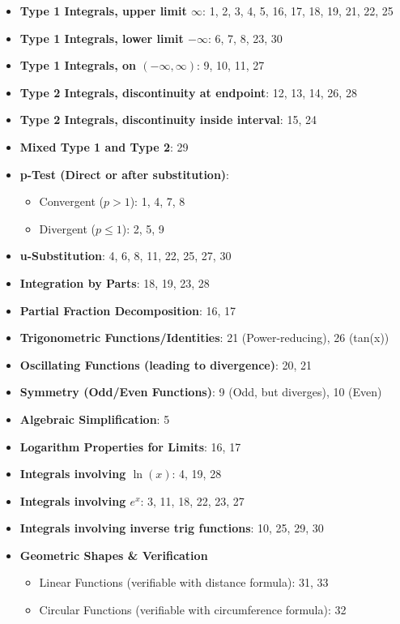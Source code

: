 \documentclass{article}
\begin{document}
\begin{itemize}
    \item \textbf{Type 1 Integrals, upper limit $\infty$}: 1, 2, 3, 4, 5, 16, 17, 18, 19, 21, 22, 25
    \item \textbf{Type 1 Integrals, lower limit $-\infty$}: 6, 7, 8, 23, 30
    \item \textbf{Type 1 Integrals, on $(-\infty, \infty)$}: 9, 10, 11, 27
    \item \textbf{Type 2 Integrals, discontinuity at endpoint}: 12, 13, 14, 26, 28
    \item \textbf{Type 2 Integrals, discontinuity inside interval}: 15, 24
    \item \textbf{Mixed Type 1 and Type 2}: 29
    \item \textbf{p-Test (Direct or after substitution)}:
    	\begin{itemize}
    		\item Convergent ($p > 1$): 1, 4, 7, 8
    		\item Divergent ($p \le 1$): 2, 5, 9
    	\end{itemize}
    \item \textbf{u-Substitution}: 4, 6, 8, 11, 22, 25, 27, 30
    \item \textbf{Integration by Parts}: 18, 19, 23, 28
    \item \textbf{Partial Fraction Decomposition}: 16, 17
    \item \textbf{Trigonometric Functions/Identities}: 21 (Power-reducing), 26 (tan(x))
    \item \textbf{Oscillating Functions (leading to divergence)}: 20, 21
    \item \textbf{Symmetry (Odd/Even Functions)}: 9 (Odd, but diverges), 10 (Even)
    \item \textbf{Algebraic Simplification}: 5
    \item \textbf{Logarithm Properties for Limits}: 16, 17
    \item \textbf{Integrals involving $\ln(x)$}: 4, 19, 28
    \item \textbf{Integrals involving $e^x$}: 3, 11, 18, 22, 23, 27
    \item \textbf{Integrals involving inverse trig functions}: 10, 25, 29, 30
    \item \textbf{Geometric Shapes \& Verification}
    \begin{itemize}
        \item Linear Functions (verifiable with distance formula): 31, 33
        \item Circular Functions (verifiable with circumference formula): 32

\end{itemize}
\end{itemize}
\end{document}
